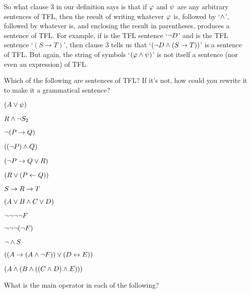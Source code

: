 
So what clause 3 in our definition says is that if $\mathcal{\varphi}$ and $\mathcal{\psi}$ are any arbitrary sentences of TFL, then the result of writing whatever $\mathcal{\varphi}$ is, followed by `$\wedge$', followed by whatever \meta{\psi} is, and enclosing the result in parentheses, produces a sentence of TFL.  For example, if \meta{\varphi} is the TFL sentence `$\neg D$' and \meta{\psi} is the TFL sentence `$(S \rightarrow T)$', then clause 3 tells us that `$(\neg D \wedge (S \rightarrow T))$' is a sentence of TFL.  But again, the string of symbols `$(\mathcal{\varphi} \wedge \mathcal{\psi})$' is not itself a sentence (nor even an expression) of TFL.

\practiceproblems
\problempart
\label{pr.wiffTFL}
Which of the following are sentences of TFL?  If it's not, how could you rewrite it to make it a grammatical sentence?
\begin{earg}
\item $(A\vee \mathcal{\psi})$
\item $R \wedge \neg S_2$
\item $\neg (P \rightarrow Q)$
\item $((\neg P) \wedge Q)$
\item $(\neg  P \rightarrow Q \vee R)$
\item $(R \vee (P \leftarrow Q))$
\item $S \rightarrow R \rightarrow T$
\item $(A \vee B  \wedge C \vee D)$
\item $\neg \neg \neg \neg F$
\item $\neg \neg \neg (\neg F)$
\item $\neg \wedge S$
\item $((A \rightarrow (A \wedge \neg F)) \vee (D \leftrightarrow E))$
\item $(A \wedge (B \wedge ((C \wedge D) \wedge E)))$

\end{earg}

\problempart
What is the main operator in each of the following?  

